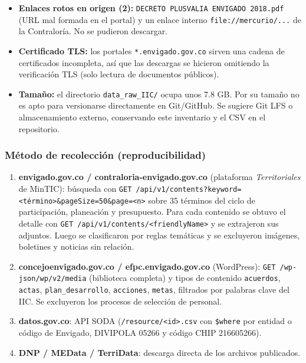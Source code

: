 \documentclass[11pt,a4paper]{article}
\begin{document}
\begin{itemize}[leftmargin=*]
\item \textbf{Enlaces rotos en origen (2):} \texttt{DECRETO PLUSVALIA ENVIGADO 2018.\allowbreak{}pdf} (URL mal formada en el portal) y un enlace interno \texttt{file:/\allowbreak{}/\allowbreak{}mercurio/\allowbreak{}.\allowbreak{}.\allowbreak{}.\allowbreak{}} de la Contraloría. No se pudieron descargar.
\item \textbf{Certificado TLS:} los portales \texttt{*.\allowbreak{}envigado.\allowbreak{}gov.\allowbreak{}co} sirven una cadena de certificados incompleta, así que las descargas se hicieron omitiendo la verificación TLS (solo lectura de documentos públicos).
\item \textbf{Tamaño:} el directorio \texttt{data\_\allowbreak{}raw\_\allowbreak{}IIC/\allowbreak{}} ocupa unos 7.8 GB. Por su tamaño no es apto para versionarse directamente en Git/GitHub. Se sugiere Git LFS o almacenamiento externo, conservando este inventario y el CSV en el repositorio.
\end{itemize}

\subsubsection*{Método de recolección (reproducibilidad)}

\begin{enumerate}[leftmargin=*]
\item \textbf{envigado.gov.co / contraloria-envigado.gov.co} (plataforma \emph{Territoriales} de MinTIC): búsqueda con \texttt{GET /\allowbreak{}api/\allowbreak{}v1/\allowbreak{}contents?keyword=\textless{}término\textgreater{}\&pageSize=50\&page=\textless{}n\textgreater{}} sobre 35 términos del ciclo de participación, planeación y presupuesto. Para cada contenido se obtuvo el detalle con \texttt{GET /\allowbreak{}api/\allowbreak{}v1/\allowbreak{}contents/\allowbreak{}\textless{}friendlyName\textgreater{}} y se extrajeron sus adjuntos. Luego se clasificaron por reglas temáticas y se excluyeron imágenes, boletines y noticias sin relación.
\item \textbf{concejoenvigado.gov.co / efpc.envigado.gov.co} (WordPress): \texttt{GET /\allowbreak{}wp-\allowbreak{}json/\allowbreak{}wp/\allowbreak{}v2/\allowbreak{}media} (biblioteca completa) y tipos de contenido \texttt{acuerdos}, \texttt{actas}, \texttt{plan\_\allowbreak{}desarrollo}, \texttt{acciones}, \texttt{metas}, filtrados por palabras clave del IIC. Se excluyeron los procesos de selección de personal.
\item \textbf{datos.gov.co}: API SODA (\texttt{/\allowbreak{}resource/\allowbreak{}\textless{}id\textgreater{}.\allowbreak{}csv} con \texttt{\$where} por entidad o código de Envigado, DIVIPOLA 05266 y código CHIP 216605266).
\item \textbf{DNP / MEData / TerriData}: descarga directa de los archivos publicados.
\end{enumerate}
\end{document}
